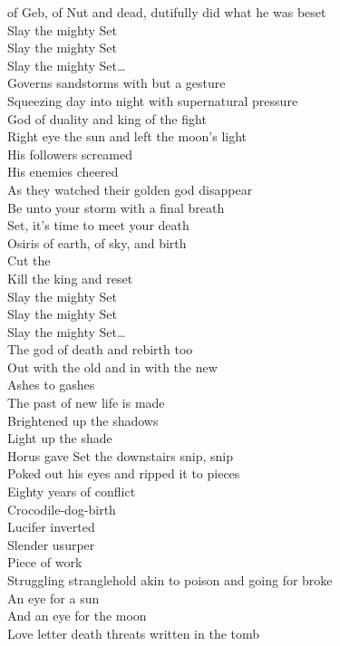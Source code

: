  of Geb, of Nut and dead, dutifully did what he was beset\\

Slay the mighty Set\\
Slay the mighty Set\\
Slay the mighty Set…\\

Governs sandstorms with but a gesture\\
Squeezing day into night with supernatural pressure\\
God of duality and king of the fight\\
Right eye the sun and left the moon's light\\
His followers screamed\\
His enemies cheered\\
As they watched their golden god disappear\\
Be unto your storm with a final breath\\
Set, it's time to meet your death\\

Osiris of earth, of sky, and birth\\
Cut the \\
Kill the king and reset\\

Slay the mighty Set\\
Slay the mighty Set\\
Slay the mighty Set…\\

The god of death and rebirth too\\
Out with the old and in with the new\\
Ashes to gashes\\
The past of new life is made\\
Brightened up the shadows\\
Light up the shade\\
Horus gave Set the downstairs snip, snip\\
Poked out his eyes and ripped it to pieces\\
Eighty years of conflict\\
Crocodile-dog-birth\\
Lucifer inverted\\
Slender usurper\\
Piece of work\\
Struggling stranglehold akin to poison and going for broke\\
An eye for a sun\\
And an eye for the moon\\
Love letter death threats written in the tomb\\

